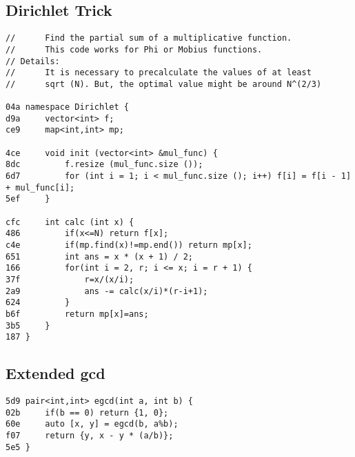 \documentclass[11pt, a4paper, twoside]{article}
\begin{document}
\subsection{Dirichlet Trick}
\begin{lstlisting}
//      Find the partial sum of a multiplicative function.
//      This code works for Phi or Mobius functions.
// Details:
//      It is necessary to precalculate the values of at least
//      sqrt (N). But, the optimal value might be around N^(2/3)

04a namespace Dirichlet {
d9a     vector<int> f;
ce9     map<int,int> mp;
    
4ce     void init (vector<int> &mul_func) {
8dc         f.resize (mul_func.size ());
6d7         for (int i = 1; i < mul_func.size (); i++) f[i] = f[i - 1] + mul_func[i];
5ef     }
    
cfc     int calc (int x) {
486         if(x<=N) return f[x];
c4e         if(mp.find(x)!=mp.end()) return mp[x];
651         int ans = x * (x + 1) / 2;
166         for(int i = 2, r; i <= x; i = r + 1) {
37f             r=x/(x/i);
2a9             ans -= calc(x/i)*(r-i+1);
624         }
b6f         return mp[x]=ans;
3b5     }
187 }
\end{lstlisting}

\subsection{Extended gcd}
\begin{lstlisting}
5d9 pair<int,int> egcd(int a, int b) {
02b 	if(b == 0) return {1, 0};
60e 	auto [x, y] = egcd(b, a%b);
f07 	return {y, x - y * (a/b)};
5e5 }
\end{lstlisting}
\end{document}
